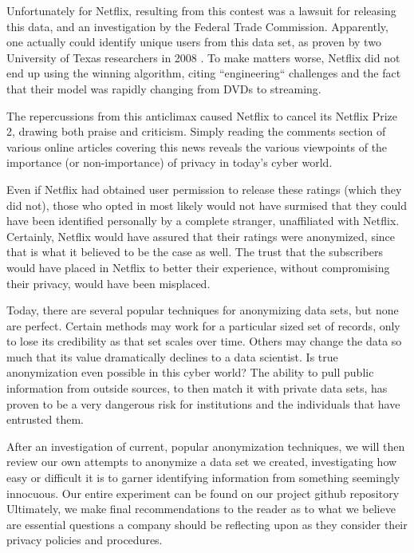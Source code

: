 \documentclass[10pt,journal,compsoc]{IEEEtran}
\begin{document}
Unfortunately for Netflix, resulting from this contest was a lawsuit for releasing this data, and an investigation by the Federal Trade Commission.    Apparently, one actually could identify unique users from this data set, as proven by two University of Texas researchers in 2008 \cite{narayanan}.  To make matters worse, Netflix did not end up using the winning algorithm, citing ``engineering`` challenges and the fact that their model was rapidly changing from DVDs to streaming\cite{johnston}.

The repercussions from this anticlimax caused Netflix to cancel its Netflix Prize 2, drawing both praise and criticism.  Simply reading the comments section of various online articles covering this news reveals the various viewpoints of the importance (or non-importance) of privacy in today’s cyber world.\cite{anderson, cheng, ohm}

Even if Netflix had obtained user permission to release these ratings (which they did not), those who opted in most likely would not have surmised that they could have been identified personally by a complete stranger, unaffiliated with Netflix.  Certainly, Netflix would have assured that their ratings were anonymized, since that is what it believed to be the case as well. The trust that the subscribers would have placed in Netflix to better their experience, without compromising their privacy, would have been misplaced.
	
Today, there are several popular techniques for anonymizing data sets, but none are perfect.  Certain methods may work for a particular sized set of records, only to lose its credibility as that set scales over time.  Others may change the data so much that its value dramatically declines to a data scientist. Is true anonymization even possible in this cyber world? The ability to pull public information from outside sources, to then match it with private data sets, has proven to be a very dangerous risk for institutions and the individuals that have entrusted them.
	
After an investigation of current, popular anonymization techniques, we will then review our own attempts to anonymize a data set we created, investigating how easy or difficult it is to garner identifying information from something seemingly innocuous.  Our entire experiment can be found on our project github repository \cite{frye}  Ultimately, we make final recommendations to the reader as to what we believe are essential questions a company should be reflecting upon as they consider their privacy policies and procedures.
\end{document}
